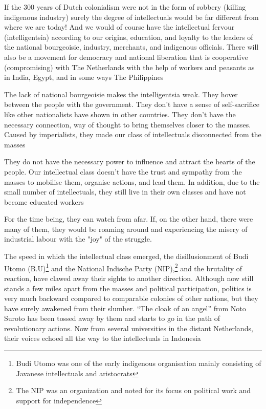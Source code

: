 If the 300 years of Dutch colonialism were not in the form of robbery (killing indigenous industry) surely 
the degree of intellectuals would be far different from where we are today! And we would of course have 
the intellectual fervour (intelligentsia) according to our origins, education, and loyalty to the leaders 
of the national bourgeoisie, industry, merchants, and indigenous officials. There will also be a movement 
for democracy and national liberation that is cooperative (compromising) with The Netherlands 
with the help of workers and peasants as in India, Egypt, and in some ways The Philippines\nline

The lack of national bourgeoisie makes the intelligentsia weak. They hover between the people with the government. 
They don't have a sense of self-sacrifice like other nationalists have shown in other countries. They don't have the 
necessary connection, way of thought to bring themselves closer to the masses. Caused by imperialists, they made our class 
of intellectuals disconnected from the masses\nline

They do not have the necessary power to influence and attract the hearts of the people. Our 
intellectual class doesn't have the trust and sympathy from the masses to mobilise them, organise actions, 
and lead them. In addition, due to the small number of intellectuals, they still live in their own classes and 
have not become educated workers\nline

For the time being, they can watch from afar. If, on the other hand, there were many of them, they would be 
roaming around and experiencing the misery of industrial labour with the "joy" of the struggle.\nline

The speed in which the intellectual class emerged, the disillusionment of Budi Utomo (B.U)\footnote[2]{Budi Utomo was one of the early indigenous organisation mainly consisting of Javanese intellectuals and aristocrats}
and the National Indische Party (NIP),\footnote[3]{The NIP was an organization and noted for its focus on political work and support for independence}
and the brutality of reaction, have clawed away their sights to another direction. Although now still stands a few miles apart 
from the masses and political participation, politics is very much backward compared to comparable colonies of other nations, 
but they have surely awakened from their slumber. “The cloak of an angel” from Noto Suroto has been tossed away by them and 
starts to go in the path of revolutionary actions. Now from several universities in the distant Netherlands, their voices 
echoed all the way to the intellectuals in Indonesia\nline

